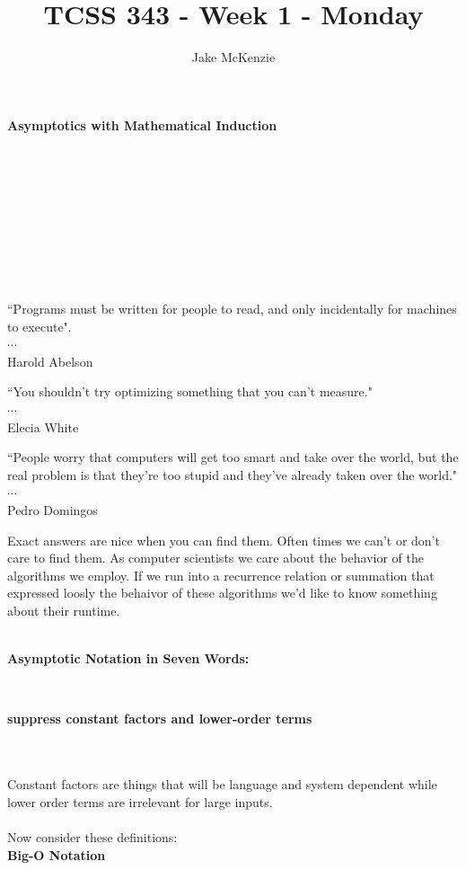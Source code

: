 \documentclass[12pt]{article}
\begin{document}
\title{TCSS 343 - Week 1 - Monday}
\author{Jake McKenzie}
\maketitle
\noindent\centerline{\textbf{Asymptotics with Mathematical Induction}}\\\\\\\\\\\\\\\\
\begin{center}
    ``Programs must be written for people to read, and only incidentally for machines to execute". \\$\cdots$\\ Harold Abelson
\end{center}
\begin{center}
    ``You shouldn't try optimizing something that you can't measure." \\$\cdots$\\ Elecia White
\end{center}
\begin{center}
    ``People worry that computers will get too smart and take over the world, but the real problem is that they're too stupid and they've already taken over the world." \\$\cdots$\\ Pedro Domingos
\end{center}
\newpage
Exact answers are nice when you can find them. Often times we can't or don't care to find them. As computer scientists we care about the behavior of the algorithms we employ. If we run into a recurrence relation or summation that expressed loosly the behaivor of these algorithms we'd like to know something about their runtime.\\\\
\centerline{\textbf{Asymptotic Notation in Seven Words:}}\\
\centerline{\textbf{suppress constant factors and lower-order terms}}\\\\
Constant factors are things that will be language and system dependent while lower order terms are irrelevant for large inputs.\\\\
Now consider these definitions:\\
\textbf{Big-O Notation}\\
\end{document}

